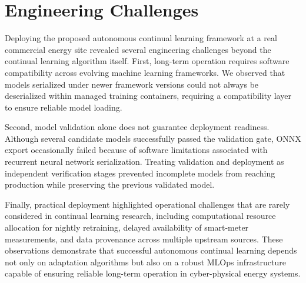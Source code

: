 \section{Engineering Challenges}
\label{sec:lessons}

Deploying the proposed autonomous continual learning framework at a
real commercial energy site revealed several engineering challenges beyond
the continual learning algorithm itself. First, long-term operation
requires software compatibility across evolving machine learning
frameworks. We observed that models serialized under newer framework
versions could not always be deserialized within managed training
containers, requiring a compatibility layer to ensure reliable model
loading.

Second, model validation alone does not guarantee deployment
readiness. Although several candidate models successfully passed the
validation gate, ONNX export occasionally failed because of software
limitations associated with recurrent neural network serialization.
Treating validation and deployment as independent verification stages
prevented incomplete models from reaching production while preserving
the previous validated model.

Finally, practical deployment highlighted operational challenges that
are rarely considered in continual learning research, including
computational resource allocation for nightly retraining, delayed
availability of smart-meter measurements, and data provenance across
multiple upstream sources. These observations demonstrate that
successful autonomous continual learning depends not only on adaptation
algorithms but also on a robust MLOps infrastructure capable of
ensuring reliable long-term operation in cyber-physical energy systems.
